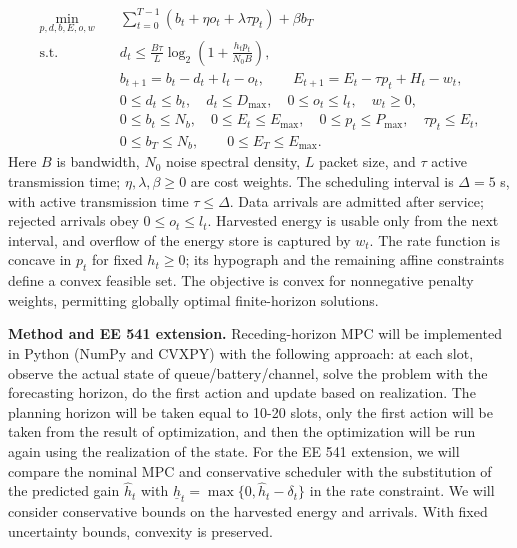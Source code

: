 \documentclass[10pt,letterpaper]{article}
\begin{document}
\begin{equation}
\begin{aligned}
\min_{p,d,b,E,o,w}\quad &\sum_{t=0}^{T-1}\left(b_t+\eta o_t+\lambda\tau p_t\right)+\beta b_T\\[-1pt]
\text{s.t.}\quad &d_t\leq\frac{B\tau}{L}\log_2\!\left(1+\frac{h_tp_t}{N_0B}\right),\\[-1pt]
&b_{t+1}=b_t-d_t+l_t-o_t,\qquad E_{t+1}=E_t-\tau p_t+H_t-w_t,\\[-1pt]
&0\leq d_t\leq b_t,\quad d_t\leq D_{\max},\quad 0\leq o_t\leq l_t,\quad w_t\geq0,\\[-1pt]
&0\leq b_t\leq N_b,\quad 0\leq E_t\leq E_{\max},\quad 0\leq p_t\leq P_{\max},\quad \tau p_t\leq E_t,\\[-1pt]
&0\leq b_T\leq N_b,\qquad 0\leq E_T\leq E_{\max}.
\end{aligned}
\end{equation}
Here $B$ is bandwidth, $N_0$ noise spectral density, $L$ packet size, and $\tau$ active transmission time; $\eta,\lambda,\beta\geq0$ are cost weights. The scheduling interval is $\Delta=5$ s, with active transmission time $\tau\leq\Delta$. Data arrivals are admitted after service; rejected arrivals obey $0\leq o_t\leq l_t$. Harvested energy is usable only from the next interval, and overflow of the energy store is captured by $w_t$. The rate function is concave in $p_t$ for fixed $h_t\geq0$; its hypograph and the remaining affine constraints define a convex feasible set. The objective is convex for nonnegative penalty weights, permitting globally optimal finite-horizon solutions.

\textbf{Method and EE 541 extension.} Receding-horizon MPC will be implemented in Python (NumPy and CVXPY) with the following approach: at each slot, observe the actual state of queue/battery/channel, solve the problem with the forecasting horizon, do the first action and update based on realization. The planning horizon will be taken equal to 10-20 slots, only the first action will be taken from the result of optimization, and then the optimization will be run again using the realization of the state. For the EE 541 extension, we will compare the nominal MPC and conservative scheduler with the substitution of the predicted gain $\widehat h_t$ with $\underline h_t=\max\{0,\widehat h_t-\delta_t\}$ in the rate constraint. We will consider conservative bounds on the harvested energy and arrivals. With fixed uncertainty bounds, convexity is preserved.
\end{document}
